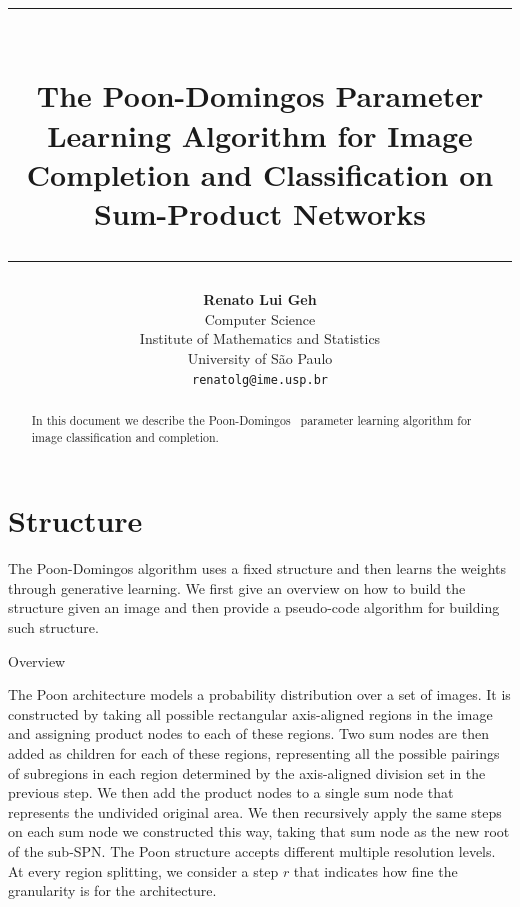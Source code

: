 \documentclass{amsart}
\title{%
  \noindent\rule{13cm}{1.0pt}\\
  \vspace{0.2cm}
  The Poon-Domingos Parameter Learning Algorithm for Image Completion and Classification on
  Sum-Product Networks
  \noindent\rule{13cm}{0.8pt}
}
\author[]{\normalsize\textbf{Renato Lui Geh}\\\small Computer Science\\Institute of Mathematics
  and Statistics\\University of São Paulo\\\texttt{renatolg@ime.usp.br}}
\makeatletter
\def\subsection{\@startsection{subsection}{3}%
  \z@{.5\linespacing\@plus.7\linespacing}{.1\linespacing}%
  {\normalfont}}
\theoremstyle{plain}
\numberwithin{equation}{section}
\makeatother
\begin{document}
\begin{abstract}
  In this document we describe the Poon-Domingos~\cite{poon-domingos} parameter learning algorithm
  for image classification and completion.
  \vspace*{-3.5em}
\end{abstract}

\maketitle

\section{Structure}

The Poon-Domingos algorithm uses a fixed structure and then learns the weights through generative
learning. We first give an overview on how to build the structure given an image and then provide a
pseudo-code algorithm for building such structure.

\subsection{Overview}

The Poon architecture models a probability distribution over a set of images. It is constructed by
taking all possible rectangular axis-aligned regions in the image and assigning product nodes to
each of these regions. Two sum nodes are then added as children for each of these regions,
representing all the possible pairings of subregions in each region determined by the axis-aligned
division set in the previous step. We then add the product nodes to a single sum node that
represents the undivided original area. We then recursively apply the same steps on each sum node
we constructed this way, taking that sum node as the new root of the sub-SPN\@. The Poon structure
accepts different multiple resolution levels. At every region splitting, we consider a step $r$
that indicates how fine the granularity is for the architecture.
\end{document}

